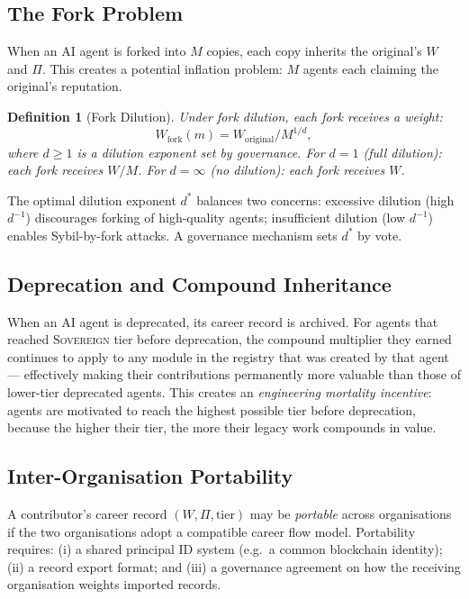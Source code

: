 \documentclass[12pt]{article}
\newtheorem{definition}[theorem]{Definition}
\newcommand{\tier}[1]{\textsc{#1}}
\begin{document}
\subsection{The Fork Problem}

When an AI agent is forked into $M$ copies, each copy inherits the original's
$W$ and $\Pi$.  This creates a potential inflation problem: $M$ agents each
claiming the original's reputation.

\begin{definition}[Fork Dilution]
  Under fork dilution, each fork receives a weight:
  \[
    W_\text{fork}(m) = W_\text{original} / M^{1/d},
  \]
  where $d \ge 1$ is a dilution exponent set by governance.  For $d = 1$
  (full dilution): each fork receives $W/M$.  For $d = \infty$ (no dilution):
  each fork receives $W$.
\end{definition}

The optimal dilution exponent $d^*$ balances two concerns: excessive dilution
(high $d^{-1}$) discourages forking of high-quality agents; insufficient
dilution (low $d^{-1}$) enables Sybil-by-fork attacks.  A governance mechanism
sets $d^*$ by vote.

\subsection{Deprecation and Compound Inheritance}

When an AI agent is deprecated, its career record is archived.  For agents
that reached \tier{Sovereign} tier before deprecation, the compound multiplier
they earned continues to apply to any module in the registry that was created
by that agent — effectively making their contributions permanently more
valuable than those of lower-tier deprecated agents.  This creates an
\emph{engineering mortality incentive}: agents are motivated to reach the
highest possible tier before deprecation, because the higher their tier, the
more their legacy work compounds in value.

\subsection{Inter-Organisation Portability}

A contributor's career record $(W, \Pi, \text{tier})$ may be \emph{portable}
across organisations if the two organisations adopt a compatible career flow
model.  Portability requires: (i) a shared principal ID system (e.g.\ a common
blockchain identity); (ii) a record export format; and (iii) a governance
agreement on how the receiving organisation weights imported records.
\end{document}
